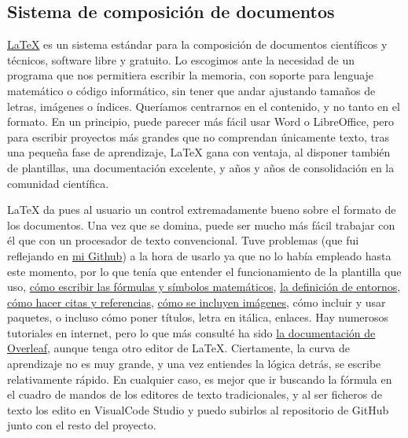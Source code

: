 \subsection{Sistema de composición de documentos}
\href{https://www.latex-project.org/}{LaTeX} es un sistema estándar para la composición de documentos 
científicos y técnicos, software libre y gratuito. Lo escogimos ante la necesidad de un programa que nos 
permitiera escribir la memoria, con soporte para lenguaje matemático o código informático, sin tener que 
andar ajustando tamaños de letras, imágenes o índices. Queríamos centrarnos en el contenido, y no tanto 
en el formato. En un principio, puede parecer más fácil usar Word o LibreOffice, pero para escribir proyectos 
más grandes que no comprendan únicamente texto, tras una pequeña fase de aprendizaje, LaTeX gana con ventaja, 
al disponer también de plantillas, una documentación excelente, y años y años de consolidación en la comunidad 
científica. 

LaTeX da pues al usuario un control extremadamente bueno sobre el formato de los documentos. Una vez que se 
domina, puede ser mucho más fácil trabajar con él que con un procesador de texto convencional. Tuve 
problemas (que fui reflejando en \href{https://github.com/ElenaMerelo/TFG/issues}{mi Github}) a la hora 
de usarlo ya que no lo había empleado hasta este momento, por lo que tenía que entender 
el funcionamiento de la plantilla que uso, \href{https://github.com/ElenaMerelo/TFG/issues/58}{cómo escribir las fórmulas 
y símbolos matemáticos}, \href{https://github.com/ElenaMerelo/TFG/issues/54}{la definición de entornos}, 
\href{https://github.com/ElenaMerelo/TFG/issues/56}{cómo hacer citas y referencias}, 
\href{https://github.com/ElenaMerelo/TFG/issues/57}{cómo se incluyen imágenes}, cómo incluir y usar paquetes, 
o incluso cómo poner títulos, letra 
en itálica, enlaces. Hay numerosos tutoriales en internet, pero lo que más consulté ha sido
 \href{https://es.overleaf.com/learn}{la documentación de Overleaf}, aunque tenga otro editor de LaTeX. Ciertamente, 
 la curva de aprendizaje no es muy grande, y una vez entiendes la lógica detrás, se escribe relativamente rápido. En 
 cualquier caso, es mejor que ir buscando la fórmula en el cuadro de mandos de los editores de texto tradicionales, 
 y al ser ficheros de texto los edito en VisualCode Studio y puedo subirlos al repositorio de GitHub junto con el resto 
 del proyecto. 

